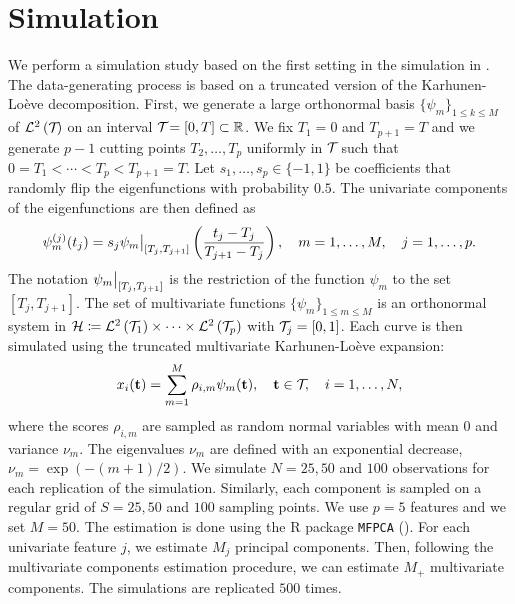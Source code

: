 
\section{Simulation} %
\label{sec:simulation}

We perform a simulation study based on the first setting in the simulation in \cite{happMultivariateFunctionalPrincipal2018}. The data-generating process is based on a truncated version of the Karhunen-Loève decomposition. First, we generate a large orthonormal basis $\{\psi_m\}_{1 \leq k \leq M}$ of $\mathcal{L}^{2}\left(\mathcal{T}_{}\right)$ on an interval $\mathcal{T}_{} = [0, T] \subset \mathbb{R}$. We fix $T_1 = 0$ and $T_{p + 1} = T$ and we generate $p - 1$ cutting points $T_2, \dots, T_p$ uniformly in $\mathcal{T}_{}$ such that $0 = T_1 < \cdots < T_p < T_{p+1} = T$. Let $s_1, \dots, s_p \in \{-1, 1\}$ be coefficients that randomly flip the eigenfunctions with probability $0.5$. The univariate components of the eigenfunctions are then defined as
\begin{equation}\label{eq:simulation_uni_component}
    \psi_m^{(j)}(t_j) = s_j \restr{\psi_m}{[T_j, T_{j + 1}]}\left(\frac{t_j - T_j}{T_{j + 1} - T_j}\right), \quad m = 1, \dots, M, \quad j = 1, \dots, p.
\end{equation}
The notation $\restr{\psi_m}{[T_j, T_{j + 1}]}$ is the restriction of the function $\psi_m$ to the set $[T_j, T_{j + 1}]$. The set of multivariate functions $\{\psi_m\}_{1 \leq m \leq M}$ is an orthonormal system in $\mathcal{H} \coloneqq \mathcal{L}^{2}\left(\mathcal{T}_{1}\right) \times \dots \times \mathcal{L}^{2}\left(\mathcal{T}_{p}\right)$ with $\mathcal{T}_{j} = [0, 1]$. Each curve is then simulated using the truncated multivariate Karhunen-Loève expansion:
\begin{equation}
    x_i(\mathbf{t}) = \sum_{m = 1}^M \rho_{i, m} \psi_m(\mathbf{t}), \quad \mathbf{t} \in \mathcal{T}_{},\quad i = 1, \dots, N,
\end{equation}
where the scores $\rho_{i, m}$ are sampled as random normal variables with mean $0$ and variance $\nu_m$. The eigenvalues $\nu_m$ are defined with an exponential decrease, $\nu_m = \exp(-(m + 1)/2)$. We simulate $N = 25, 50$ and $100$ observations for each replication of the simulation. Similarly, each component is sampled on a regular grid of $S = 25, 50$ and $100$ sampling points. We use $p = 5$ features and we set $M = 50$. The estimation is done using the \textsf{R} package \texttt{MFPCA} (\cite{happ-kurzObjectOrientedSoftwareFunctional2020}). For each univariate feature $j$, we estimate $M_j$ principal components. Then, following the multivariate components estimation procedure, we can estimate $M_+$ multivariate components. The simulations are replicated $500$ times.

